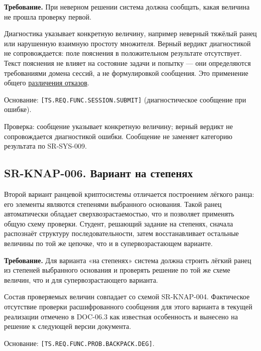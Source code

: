 \documentclass[12pt,a4paper]{article}
\begin{document}
\textbf{Требование.} При неверном решении система должна сообщать, какая величина не прошла проверку первой.

Диагностика указывает конкретную величину, например неверный тяжёлый ранец или нарушенную взаимную простоту множителя. Верный вердикт диагностикой не сопровождается: поле пояснения в положительном результате отсутствует. Текст пояснения не влияет на состояние задачи и попытку --- они определяются требованиями домена сессий, а не формулировкой сообщения. Это применение общего \hyperref[sr-sys-009-ux440ux430ux437ux43bux438ux447ux435ux43dux438ux435-ux43eux442ux43aux430ux437ux43eux432]{различения отказов}.

Основание: \texttt{[TS.\allowbreak{}REQ.\allowbreak{}FUNC.\allowbreak{}SESSION.\allowbreak{}SUBMIT]} (диагностическое сообщение при ошибке).

Проверка: сообщение указывает конкретную величину; верный вердикт не сопровождается диагностикой ошибки. Сообщение не заменяет категорию результата по SR-SYS-009.

\subsection{SR-KNAP-006. Вариант на степенях}\label{sr-knap-006-ux432ux430ux440ux438ux430ux43dux442-ux43dux430-ux441ux442ux435ux43fux435ux43dux44fux445}

\hypertarget{sr-knap-006-вариант-на-степенях}{}

Второй вариант ранцевой криптосистемы отличается построением лёгкого ранца: его элементы являются степенями выбранного основания. Такой ранец автоматически обладает сверхвозрастаемостью, что и позволяет применять общую схему проверки. Студент, решающий задание на степенях, сначала распознаёт структуру последовательности, затем восстанавливает остальные величины по той же цепочке, что и в супервозрастающем варианте.

\textbf{Требование.} Для варианта «на степенях» система должна строить лёгкий ранец из степеней выбранного основания и проверять решение по той же схеме величин, что и для супервозрастающего варианта.

Состав проверяемых величин совпадает со схемой SR-KNAP-004. Фактическое отсутствие проверки расшифрованного сообщения для этого варианта в текущей реализации отмечено в DOC-06.3 как известная особенность и вынесено на решение к следующей версии документа.

Основание: \texttt{[TS.\allowbreak{}REQ.\allowbreak{}FUNC.\allowbreak{}PROB.\allowbreak{}BACKPACK.\allowbreak{}DEG]}.
\end{document}
